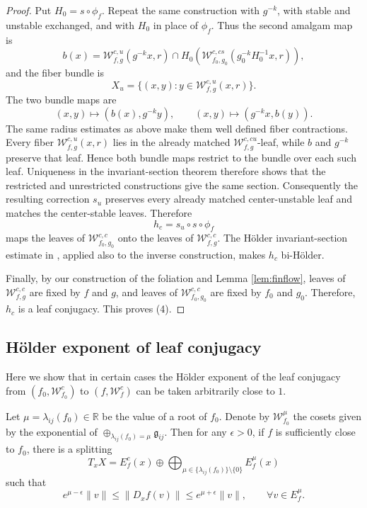 \documentclass[11pt]{amsart}
\numberwithin{equation}{section}
\newcommand{\R}{\mathbb{R}}
\newcommand{\W}{\mathcal{W}}
\theoremstyle{plain}
\begin{document}
\begin{proof}
Put $H_0=s\circ\phi_f$.  Repeat the same construction with
$g^{-k}$, with stable and unstable exchanged, and with $H_0$ in place
of $\phi_f$.  Thus the second amalgam map is
\[
b(x)=\mathcal W^{c,u}_{f,g}(g^{-k}x,r)\cap
H_0\!\left(\mathcal W^{c,cs}_{f_0,g_0}
 (g_0^{-k}H_0^{-1}x,r)\right),
\]
and the fiber bundle is
\[
X_u=\{(x,y):y\in\mathcal W^{c,u}_{f,g}(x,r)\}.
\]
The two bundle maps are
\[
(x,y)\longmapsto(b(x),g^{-k}y),\qquad
(x,y)\longmapsto(g^{-k}x,b(y)).
\]
The same radius estimates as above make them well defined fiber
contractions.  Every fiber $\mathcal W^{c,u}_{f,g}(x,r)$ lies in the
already matched $\mathcal W^{c,cu}_{f,g}$-leaf, while $b$ and $g^{-k}$
preserve that leaf.  Hence both bundle maps restrict to the bundle over
each such leaf.  Uniqueness in the
invariant-section theorem therefore shows that the restricted and
unrestricted constructions give the same section.  Consequently the resulting correction $s_u$ preserves
every already matched center-unstable leaf and matches the
center-stable leaves. Therefore
 \[
h_c=s_u\circ s\circ\phi_f
\]
maps the leaves of  $\mathcal W^{c,c}_{f_0,g_0}$ onto the leaves of
 $\mathcal W^{c,c}_{f,g}$.  The H\"older  invariant-section estimate in
 \cite[Proposition~11 and Section~9]{PSWholrev}, applied also to the  inverse
construction, makes $h_c$ bi-H\"older.

Finally, by our construction of the foliation and Lemma \ref{lem:finflow}, leaves of $\W^{c,c}_{f,g}$ are fixed by $f$ and $g$, and leaves of $\W^{c,c}_{f_0,g_0}$ are fixed by $f_0$ and $g_0$. Therefore, $h_c$ is a leaf conjugacy. This
proves (4).
\end{proof}




\subsection{H\"older exponent of leaf conjugacy}
Here we show that in certain cases the H\"older exponent of the leaf
conjugacy from $(f_0,\mathcal W^c_{f_0})$ to $(f,\mathcal W^c_{f})$ can be
taken arbitrarily close to $1$.

Let $\mu=\lambda_{ij}(f_0)\in\R$ be  the value of a root of $f_0$.
Denote by $\mathcal W^\mu_{f_0}$ the cosets given by the exponential of
 $\oplus_{\lambda_{ij}(f_0)=\mu}\mathfrak g_{ij}$. Then for any
$\epsilon>0$, if $f$ is sufficiently close to $f_0$, there is a splitting
 \[
T_xX=E^c_f(x)\oplus
 \bigoplus_{\mu\in \{\lambda_{ij}(f_0)\}\setminus\{0\}}E^\mu_f(x)
\]
such that
\[
e^{\mu-\epsilon}\|v\|\le \|D_xf(v)\|\le e^{\mu+\epsilon}\|v\|,
\qquad\forall v\in E^\mu_f.
\]
\end{document}
